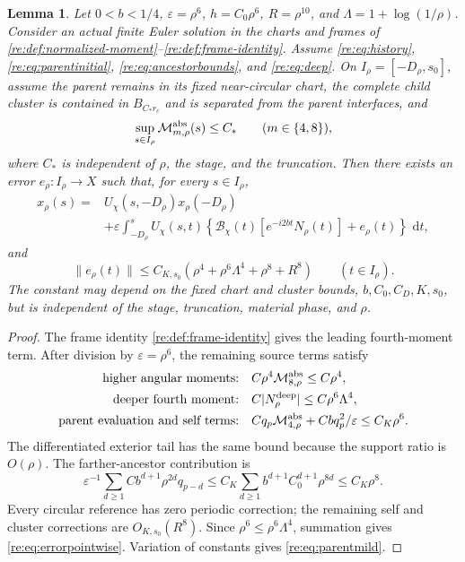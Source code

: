 \documentclass[11pt]{amsart}
\newtheorem{lemma}[theorem]{Lemma}
\theoremstyle{remark}
\numberwithin{equation}{section}
\newcommand{\dd}{\,\mathrm d}
\begin{document}
\begin{lemma}
\label{re:lem:budget}
Let $0<b<1/4$, $\varepsilon=\rho^6$, $h=C_0\rho^6$,
$R=\rho^{10}$, and $\Lambda=1+\log(1/\rho)$.
Consider an actual finite Euler solution in the charts and frames
of \eqref{re:def:normalized-moment}--\eqref{re:def:frame-identity}.
Assume \eqref{re:eq:history}, \eqref{re:eq:parentinitial},
\eqref{re:eq:ancestorbounds}, and \eqref{re:eq:deep}. On
$I_\rho=[-D_\rho,s_0]$, assume the parent remains in its fixed
near-circular chart, the complete child cluster is contained in
$B_{C_*r_c}$ and is separated from the parent interfaces, and
\[
 \sup_{s\in I_\rho}\mathcal M_{m,\rho}^{\rm abs}(s)\le C_*
 \qquad(m\in\{4,8\}),
\]
where $C_*$ is independent of $\rho$, the stage, and the truncation.
Then there exists an error $e_\rho:I_\rho\to X$ such that, for
every $s\in I_\rho$,
\begin{equation}\label{re:eq:parentmild}
 \begin{split}
 x_\rho(s)={}&U_\chi(s,-D_\rho)x_\rho(-D_\rho)\\
 &+\varepsilon\int_{-D_\rho}^s U_\chi(s,t)
 \left\{\mathcal B_\chi(t)[e^{-i2bt}N_\rho(t)]+e_\rho(t)\right\}
       \,\dd t,
 \end{split}
\end{equation}
and
\begin{equation}\label{re:eq:errorpointwise}
 \|e_\rho(t)\|\le C_{K,s_0}
       (\rho^4+\rho^6\Lambda^4+\rho^8+R^8)
 \qquad(t\in I_\rho).
\end{equation}
The constant may depend on the fixed chart and cluster bounds,
$b,C_0,C_D,K,s_0$, but is independent of the stage, truncation,
material phase, and $\rho$.
\end{lemma}
\begin{proof}
The frame identity \eqref{re:def:frame-identity} gives the leading
fourth-moment term. After division by $\varepsilon=\rho^6$,
the remaining source terms satisfy
\[
 \begin{aligned}
 \text{higher angular moments:}\quad&
 C\rho^4\mathcal M_{8,\rho}^{\rm abs}\le C\rho^4,\\
 \text{deeper fourth moment:}\quad&
 C|N_\rho^{\rm deep}|\le C\rho^6\Lambda^4,\\
 \text{parent evaluation and self terms:}\quad&
 Cq_p\mathcal M_{4,\rho}^{\rm abs}
       +Cbq_p^2/\varepsilon\le C_K\rho^6.
 \end{aligned}
\]
The differentiated exterior tail has the same bound because
the support ratio is $O(\rho)$. The farther-ancestor contribution is
\[
 \varepsilon^{-1}\sum_{d\ge1}Cb^{d+1}\rho^{2d}q_{p-d}
 \le C_K\sum_{d\ge1}b^{d+1}C_0^{d+1}\rho^{8d}
 \le C_K\rho^8.
\]
Every circular reference has zero periodic correction; the
remaining self and cluster corrections are $O_{K,s_0}(R^8)$.
Since $\rho^6\le\rho^6\Lambda^4$, summation gives
\eqref{re:eq:errorpointwise}. Variation of constants gives
\eqref{re:eq:parentmild}.
\end{proof}
\end{document}
